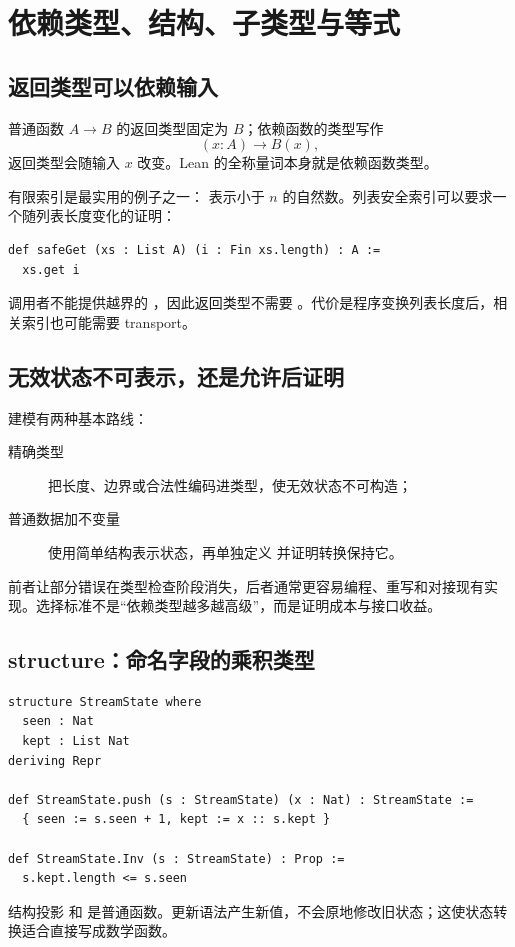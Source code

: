 \chapter{依赖类型、结构、子类型与等式}

\section{返回类型可以依赖输入}

普通函数 $A\to B$ 的返回类型固定为 $B$；依赖函数的类型写作
\[
(x:A)\to B(x),
\]
返回类型会随输入 $x$ 改变。Lean 的全称量词本身就是依赖函数类型。

有限索引是最实用的例子之一： 表示小于 $n$ 的自然数。列表安全索引可以要求一个随列表长度变化的证明：
\begin{lstlisting}
def safeGet (xs : List A) (i : Fin xs.length) : A :=
  xs.get i
\end{lstlisting}
调用者不能提供越界的 ，因此返回类型不需要 。代价是程序变换列表长度后，相关索引也可能需要 transport。

\section{无效状态不可表示，还是允许后证明}

建模有两种基本路线：
\begin{description}
  \item[精确类型] 把长度、边界或合法性编码进类型，使无效状态不可构造；
  \item[普通数据加不变量] 使用简单结构表示状态，再单独定义  并证明转换保持它。
\end{description}
前者让部分错误在类型检查阶段消失，后者通常更容易编程、重写和对接现有实现。选择标准不是“依赖类型越多越高级”，而是证明成本与接口收益。

\section{structure：命名字段的乘积类型}

\begin{lstlisting}
structure StreamState where
  seen : Nat
  kept : List Nat
deriving Repr

def StreamState.push (s : StreamState) (x : Nat) : StreamState :=
  { seen := s.seen + 1, kept := x :: s.kept }

def StreamState.Inv (s : StreamState) : Prop :=
  s.kept.length <= s.seen
\end{lstlisting}
结构投影  和  是普通函数。更新语法产生新值，不会原地修改旧状态；这使状态转换适合直接写成数学函数。


